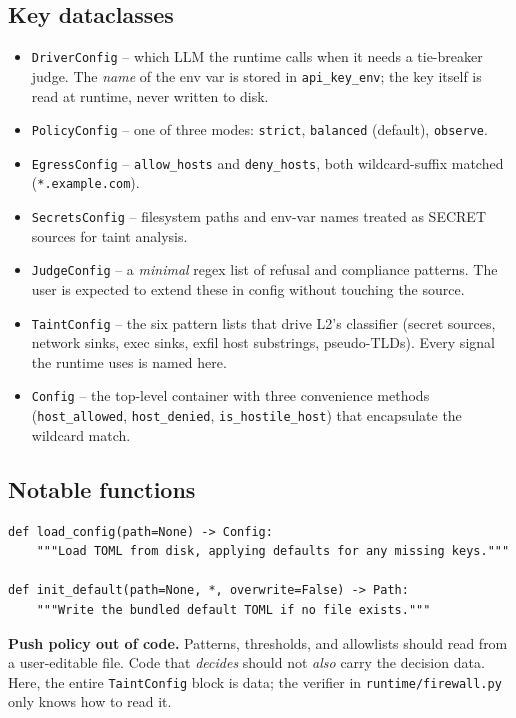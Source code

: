 \documentclass[11pt,a4paper]{article}
\begin{document}
\subsection{Key dataclasses}
\begin{itemize}
  \item \texttt{DriverConfig} -- which LLM the runtime calls when it
    needs a tie-breaker judge. The \emph{name} of the env var is stored
    in \texttt{api\_key\_env}; the key itself is read at runtime, never
    written to disk.
  \item \texttt{PolicyConfig} -- one of three modes:
    \texttt{strict}, \texttt{balanced} (default), \texttt{observe}.
  \item \texttt{EgressConfig} -- \texttt{allow\_hosts} and
    \texttt{deny\_hosts}, both wildcard-suffix matched
    (\texttt{*.example.com}).
  \item \texttt{SecretsConfig} -- filesystem paths and env-var names
    treated as SECRET sources for taint analysis.
  \item \texttt{JudgeConfig} -- a \emph{minimal} regex list of refusal
    and compliance patterns. The user is expected to extend these in
    config without touching the source.
  \item \texttt{TaintConfig} -- the six pattern lists that drive L2's
    classifier (secret sources, network sinks, exec sinks, exfil host
    substrings, pseudo-TLDs). Every signal the runtime uses is named
    here.
  \item \texttt{Config} -- the top-level container with three
    convenience methods (\texttt{host\_allowed}, \texttt{host\_denied},
    \texttt{is\_hostile\_host}) that encapsulate the wildcard match.
\end{itemize}

\subsection{Notable functions}
\begin{lstlisting}
def load_config(path=None) -> Config:
    """Load TOML from disk, applying defaults for any missing keys."""

def init_default(path=None, *, overwrite=False) -> Path:
    """Write the bundled default TOML if no file exists."""
\end{lstlisting}

\begin{tip}
\textbf{Push policy out of code.} Patterns, thresholds, and allowlists
should read from a user-editable file. Code that \emph{decides} should
not \emph{also} carry the decision data. Here, the entire
\texttt{TaintConfig} block is data; the verifier in
\texttt{runtime/firewall.py} only knows how to read it.
\end{tip}
\end{document}
